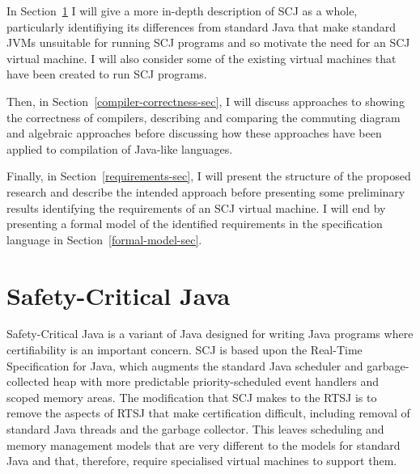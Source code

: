 \documentclass[a4paper,10pt]{article}
\begin{document}
In Section~\ref{scj-sec} I will give a more in-depth description of SCJ as a
whole, particularly identifiying its differences from standard Java that make
standard JVMs unsuitable for running SCJ programs and so motivate the need for
an SCJ virtual machine. I will also consider some of the existing virtual
machines that have been created to run SCJ programs.

 Then, in Section~\ref{compiler-correctness-sec}, I will
discuss approaches to showing the correctness of compilers, describing and
comparing the commuting diagram and algebraic approaches before discussing how
these approaches have been applied to compilation of Java-like
languages.

Finally, in Section~\ref{requirements-sec}, I will present the structure of the
proposed research and describe the intended approach before presenting some
preliminary results identifying the requirements of an SCJ virtual machine. I
will end by presenting a formal model of the identified requirements in the
\Circus{} specification language in Section~\ref{formal-model-sec}.


\section{Safety-Critical Java}
\label{scj-sec}

Safety-Critical Java is a variant of Java designed for writing Java programs
where certifiability is an important concern.  SCJ is based upon the Real-Time
Specification for Java, which augments the standard Java scheduler and
gar\-bage-collected heap with more predictable priority-scheduled event handlers
and scoped memory areas.  The modification that SCJ makes to the RTSJ is to
remove the aspects of RTSJ that make certification difficult, including removal
of standard Java threads and the garbage collector.  This leaves scheduling and
memory management models that are very different to the models for standard Java
and that, therefore, require specialised virtual machines to support them.
\end{document}
